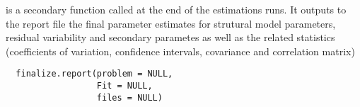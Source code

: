 %
\begin{Description}\relax
{} is a secondary function called at the end of the 
estimations runs. It outputs to the report file the final parameter estimates
for strutural model parameters, residual variability and secondary parametes
as well as the related statistics (coefficients of variation, confidence
intervals, covariance and correlation matrix)
\end{Description}
%
\begin{Usage}
\begin{verbatim}
  finalize.report(problem = NULL,
                  Fit = NULL,
                  files = NULL)
\end{verbatim}
\end{Usage}
%
